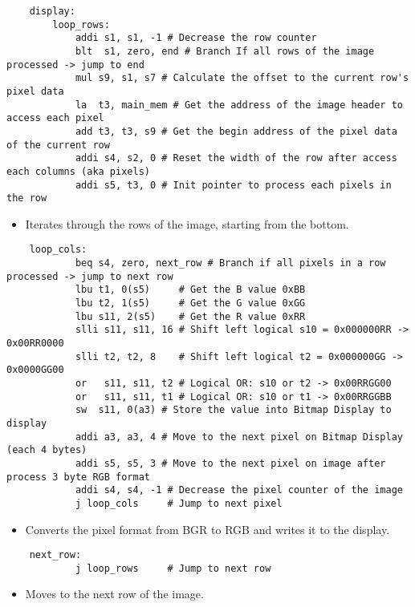 \documentclass{article}
\begin{document}
\begin{verbatim}
    display:    
        loop_rows:
            addi s1, s1, -1 # Decrease the row counter               
            blt  s1, zero, end # Branch If all rows of the image processed -> jump to end      
            mul s9, s1, s7 # Calculate the offset to the current row's pixel data     
            la  t3, main_mem # Get the address of the image header to access each pixel    
            add t3, t3, s9 # Get the begin address of the pixel data of the current row      
            addi s4, s2, 0 # Reset the width of the row after access each columns (aka pixels)                     
            addi s5, t3, 0 # Init pointer to process each pixels in the row
\end{verbatim}
\begin{itemize}
    \item Iterates through the rows of the image, starting from the bottom.
\end{itemize}
\begin{verbatim}
    loop_cols:
            beq s4, zero, next_row # Branch if all pixels in a row processed -> jump to next row            
            lbu t1, 0(s5)     # Get the B value 0xBB     
            lbu t2, 1(s5)     # Get the G value 0xGG   
            lbu s11, 2(s5)    # Get the R value 0xRR  
            slli s11, s11, 16 # Shift left logical s10 = 0x000000RR -> 0x00RR0000
            slli t2, t2, 8    # Shift left logical t2 = 0x000000GG -> 0x0000GG00
            or   s11, s11, t2 # Logical OR: s10 or t2 -> 0x00RRGG00
            or   s11, s11, t1 # Logical OR: s10 or t1 -> 0x00RRGGBB
            sw  s11, 0(a3) # Store the value into Bitmap Display to display
            addi a3, a3, 4 # Move to the next pixel on Bitmap Display (each 4 bytes)
            addi s5, s5, 3 # Move to the next pixel on image after process 3 byte RGB format 
            addi s4, s4, -1 # Decrease the pixel counter of the image 
            j loop_cols     # Jump to next pixel
\end{verbatim}
\begin{itemize}
    \item Converts the pixel format from BGR to RGB and writes it to the display.
\end{itemize}
\begin{verbatim}
    next_row:
            j loop_rows     # Jump to next row
\end{verbatim}
\begin{itemize}
    \item Moves to the next row of the image.
\end{itemize}
\end{document}
